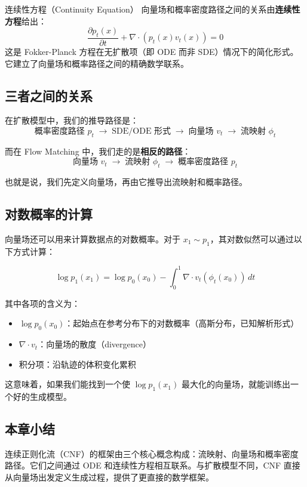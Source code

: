 \documentclass[a4paper]{article}
\begin{document}
\begin{knowledgebox}{连续性方程（Continuity Equation）}
向量场和概率密度路径之间的关系由\textbf{连续性方程}给出：
$$\frac{\partial p_t(x)}{\partial t} + \nabla \cdot (p_t(x) v_t(x)) = 0$$
这是 Fokker-Planck 方程在无扩散项（即 ODE 而非 SDE）情况下的简化形式。它建立了向量场和概率路径之间的精确数学联系。
\end{knowledgebox}

\subsection{三者之间的关系}

在扩散模型中，我们的推导路径是：
$$\text{概率密度路径 } p_t \;\longrightarrow\; \text{SDE/ODE 形式} \;\longrightarrow\; \text{向量场 } v_t \;\longrightarrow\; \text{流映射 } \phi_t$$

而在 Flow Matching 中，我们走的是\textbf{相反的路径}：
$$\text{向量场 } v_t \;\longrightarrow\; \text{流映射 } \phi_t \;\longrightarrow\; \text{概率密度路径 } p_t$$

也就是说，我们先定义向量场，再由它推导出流映射和概率路径。

\subsection{对数概率的计算}

向量场还可以用来计算数据点的对数概率。对于 $x_1 \sim p_1$，其对数似然可以通过以下方式计算：

$$\log p_1(x_1) = \log p_0(x_0) - \int_0^1 \nabla \cdot v_t(\phi_t(x_0)) \, dt$$

其中各项的含义为：
\begin{itemize}
    \item $\log p_0(x_0)$：起始点在参考分布下的对数概率（高斯分布，已知解析形式）
    \item $\nabla \cdot v_t$：向量场的散度（divergence）
    \item 积分项：沿轨迹的体积变化累积
\end{itemize}

这意味着，如果我们能找到一个使 $\log p_1(x_1)$ 最大化的向量场，就能训练出一个好的生成模型。

\subsection{本章小结}

连续正则化流（CNF）的框架由三个核心概念构成：流映射、向量场和概率密度路径。它们之间通过 ODE 和连续性方程相互联系。与扩散模型不同，CNF 直接从向量场出发定义生成过程，提供了更直接的数学框架。
\end{document}
